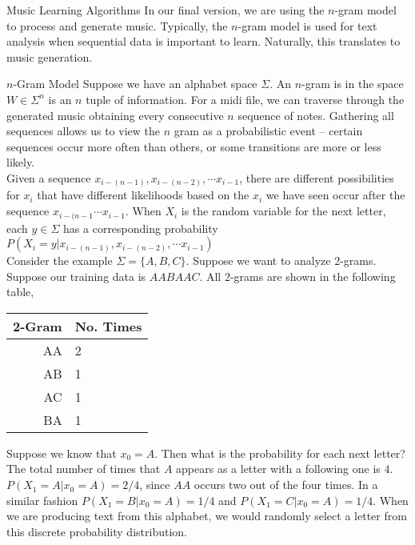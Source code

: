 \documentclass[11pt]{article}
\begin{document}
\begin{section}{Music Learning Algorithms}
In our final version, we are using the $n$-gram model to process and generate music. Typically, the $n$-gram model is used for text analysis when sequential data is important to learn. Naturally, this translates to music generation. 


\begin{subsection}{$n$-Gram Model}
Suppose we have an alphabet space $\Sigma$. An $n$-gram is in the space $W \in \Sigma^n$ is an $n$ tuple of information. For a midi file, we can traverse through the generated music obtaining every consecutive $n$ sequence of notes. Gathering all sequences allows us to view the $n$ gram as a probabilistic event -- certain sequences occur more often than others, or some transitions are more or less likely.\\

Given a sequence $x_{i-(n-1)}, x_{i-(n-2)}, \cdots x_{i-1}$, there are different possibilities for $x_{i}$ that have different likelihoods based on the $x_i$ we have seen occur after the sequence $x_{i - (n - 1}\cdots x_{i-1}$. When $X_i$ is the random variable for the next letter, each $y \in \Sigma$ has a corresponding probability $P(X_i = y|x_{i-(n-1)}, x_{i-(n-2)}, \cdots x_{i-1})$\\

Consider the example $\Sigma = \{A, B, C\}$. Suppose we want to analyze 2-grams. Suppose our training data is $AABAAC$. All 2-grams are shown in the following table,
\begin{center}
\begin{tabular}{|r|l|}
\hline 2-Gram & No. Times \\
\hline AA & 2\\
\hline AB & 1\\
\hline AC & 1\\
\hline BA & 1\\
\hline
\end{tabular}
\end{center}
Suppose we know that $x_0 = A$. Then what is the probability for each next letter? The total number of times that $A$ appears as a letter with a following one is $4$. $P(X_1 = A | x_0 = A) = 2/4$, since $AA$ occurs two out of the four times. In a similar fashion $P(X_1 = B | x_0 = A) = 1/4$ and $P(X_1 = C | x_0 = A) = 1/4$. When we are producing text from this alphabet, we would randomly select a letter from this discrete probability distribution.\\


\end{subsection}
\end{section}
\end{document}
